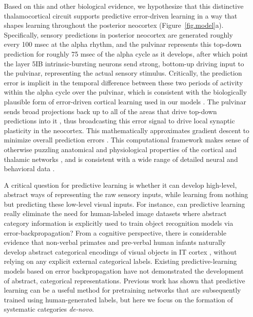 \documentclass[12pt,twoside,lineno]{pnas-new}  %
\begin{document}
Based on this and other biological evidence, we hypothesize that this distinctive thalamocortical circuit supports predictive error-driven learning in a way that shapes learning throughout the posterior neocortex \cite{OReillyWyatteRohrlich14} (Figure~\ref{fig.model}a).  Specifically, sensory predictions in posterior neocortex are generated roughly every 100 msec at the alpha rhythm, and the pulvinar represents this top-down prediction for roughly 75 msec of the alpha cycle as it develops, after which point the layer 5IB intrinsic-bursting neurons send strong, bottom-up driving input to the pulvinar, representing the actual sensory stimulus.  Critically, the prediction error is implicit in the temporal difference between these two periods of activity within the alpha cycle over the pulvinar, which is consistent with the biologically plausible form of error-driven cortical learning used in our models \cite{OReilly96}.  The pulvinar sends broad projections back up to all of the areas that drive top-down predictions into it \cite{Shipp03,Mumford91}, thus broadcasting this error signal to drive local synaptic plasticity in the neocortex. This mathematically approximates gradient descent to minimize overall prediction errors \cite{OReilly96}.  This computational framework makes sense of otherwise puzzling anatomical and physiological properties of the cortical and thalamic networks \cite{ShermanGuillery06}, and is consistent with a wide range of detailed neural and behavioral data \cite{OReillyWyatteRohrlich14}.

A critical question for predictive learning is whether it can develop high-level, abstract ways of representing the raw sensory inputs, while learning from nothing but predicting these low-level visual inputs.  For instance, can predictive learning really eliminate the need for human-labeled image datasets where abstract category information is explicitly used to train object recognition models via error-backpropagation?  From a cognitive perspective, there is considerable evidence that non-verbal primates and pre-verbal human infants naturally develop abstract categorical encodings of visual objects in IT cortex \cite{CadieuHongYaminsEtAl14}, without relying on any explicit external categorical labels.  Existing predictive-learning models based on error backpropagation \cite{LotterKreimanCox16} have not demonstrated the development of abstract, categorical representations.  Previous work has shown that predictive learning can be a useful method for pretraining networks that are subsequently trained using human-generated labels, but here we focus on the formation of systematic categories {\em de-novo}.
\end{document}
